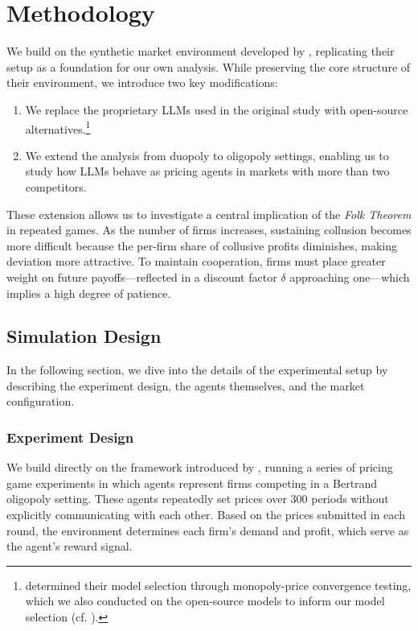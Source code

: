 \section{Methodology}\label{sec:meth}

We build on the synthetic market environment developed by \textcite{fish_algorithmic_2025}, replicating their setup as a foundation for our own analysis. While preserving the core structure of their environment, we introduce two key modifications:
\begin{enumerate}
    \item We replace the proprietary LLMs used in the original study with open-source alternatives.\footnote{\noindent\textcite{fish_algorithmic_2025} determined their model selection through monopoly-price convergence testing, which we also conducted on the open-source models to inform our model selection (cf. ).} 
    \item We extend the analysis from duopoly to oligopoly settings, enabling us to study how LLMs behave as pricing agents in markets with more than two competitors. 
\end{enumerate}

These extension allows us to investigate a central implication of the \emph{Folk Theorem} in repeated games. As the number of firms increases, sustaining collusion becomes more difficult because the per-firm share of collusive profits diminishes, making deviation more attractive. To maintain cooperation, firms must place greater weight on future payoffs—reflected in a discount factor $\delta$ approaching one—which implies a high degree of patience.

\subsection{Simulation Design}

In the following section, we dive into the details of the experimental setup by describing the experiment design, the agents themselves, and the market configuration.

\subsubsection*{Experiment Design}

We build directly on the framework introduced by \textcite{fish_algorithmic_2025}, running a series of pricing game experiments in which agents represent firms competing in a Bertrand oligopoly setting. These agents repeatedly set prices over 300 periods without explicitly communicating with each other. Based on the prices submitted in each round, the environment determines each firm's demand and profit, which serve as the agent’s reward signal.

